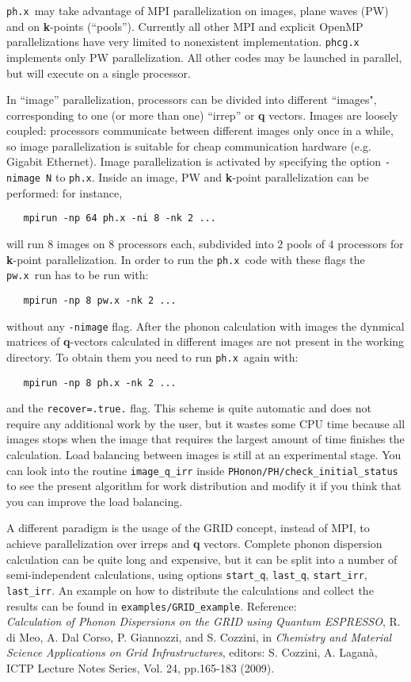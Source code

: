 \documentclass[12pt,a4paper]{article}
\def\pwx{\texttt{pw.x}}
\def\phx{\texttt{ph.x}}
\begin{document}
\phx\ may take advantage of MPI parallelization on images, plane waves (PW) 
and on {\bf k}-points (``pools''). Currently all other MPI and explicit 
OpenMP parallelizations have very limited to nonexistent implementation.
\texttt{phcg.x} implements only PW parallelization.
All other codes may be launched in parallel, but will execute 
on a single processor.

In  ``image'' parallelization, processors can be divided into different 
``images", corresponding to one (or more than one) ``irrep'' or {\bf q}
vectors. Images are loosely coupled: processors communicate
between different images only once in a while, so image parallelization
is suitable for cheap communication hardware (e.g. Gigabit Ethernet).
Image parallelization is activated by specifying the option 
\texttt{-nimage N} to \phx. Inside an image, PW and {\bf k}-point 
parallelization can be performed: for instance,
\begin{verbatim}
   mpirun -np 64 ph.x -ni 8 -nk 2 ...
\end{verbatim}
will run $8$ images on $8$ processors each, subdivided into $2$ pools 
of $4$ processors for {\bf k}-point parallelization. In order 
to run the \phx\ code with these flags the \pwx\ run has to be run with:
\begin{verbatim}
   mpirun -np 8 pw.x -nk 2 ...
\end{verbatim}
without any {\tt -nimage} flag. 
After the phonon calculation with images the dynmical matrices of 
{\bf q}-vectors calculated in different images are not present in the
working directory. To obtain them you need to run 
\phx\ again with:
\begin{verbatim}
   mpirun -np 8 ph.x -nk 2 ...
\end{verbatim}
and the {\tt recover=.true.} flag. This scheme is quite automatic and
does not require any additional work by the user, but it wastes some 
CPU time because all images stops when the image that requires the 
largest amount of time finishes the calculation. Load balancing 
between images is still at
an experimental stage. You can look into the routine {\tt image\_q\_irr} 
inside {\tt PHonon/PH/check\_initial\_status} to see the present
algorithm for work distribution and modify it if you think that
you can improve the load balancing.

A different paradigm is the usage of the GRID concept, instead of MPI,
to achieve parallelization over irreps and  {\bf q} vectors.
Complete phonon dispersion calculation can be quite long and
expensive, but it can be split into a number of semi-independent
calculations, using options \texttt{start\_q}, \texttt{last\_q},
\texttt{start\_irr}, \texttt{last\_irr}. An example on how to
distribute the calculations and collect the results can be found
in \texttt{examples/GRID\_example}. Reference:\\
{\it Calculation of Phonon Dispersions on the GRID using Quantum
     ESPRESSO},
     R. di Meo, A. Dal Corso, P. Giannozzi, and S. Cozzini, in
     {\it Chemistry and Material Science Applications on Grid Infrastructures},
     editors: S. Cozzini, A. Lagan\`a, ICTP Lecture Notes Series,
     Vol. 24, pp.165-183 (2009).
\end{document}
